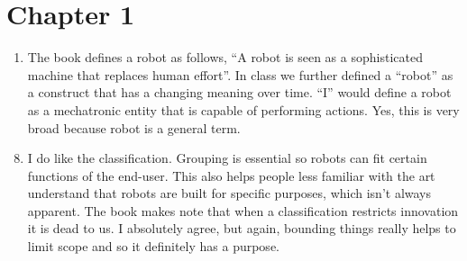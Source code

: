 \documentclass[letterpaper,10pt,english]{sphinxmanual}
\begin{document}
\section{Chapter 1}
\label{\detokenize{index:chapter-1}}\begin{enumerate}
\item {} 

The book defines a robot as follows, “A robot is seen as a sophisticated machine that replaces human effort”. In class we further defined a “robot” as a construct that has a changing meaning over time. “I” would define a robot as a mechatronic entity that is capable of performing actions. Yes, this is very broad because robot is a general term.

\end{enumerate}
\begin{enumerate}
\setcounter{enumi}{7}
\item {} 

I do like the classification. Grouping is essential so robots can fit certain functions of the end-user. This also helps people less familiar with the art understand that robots are built for specific purposes, which isn’t always apparent. The book makes note that when a classification restricts innovation it is dead to us. I absolutely agree, but again, bounding things really helps to limit scope and so it definitely has a purpose.

\end{enumerate}
\end{document}
